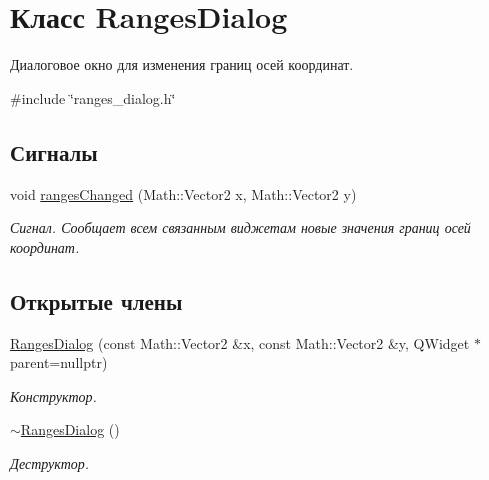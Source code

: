 \hypertarget{class_ranges_dialog}{}\section{Класс Ranges\+Dialog}
\label{class_ranges_dialog}


Диалоговое окно для изменения границ осей координат.  




{\ttfamily \#include \char`\"{}ranges\+\_\+dialog.\+h\char`\"{}}

\subsection*{Сигналы}
\begin{DoxyCompactItemize}
\item 
void \hyperlink{class_ranges_dialog_a8d4fb1f4d8bd2e5e3d0bc36f390e4974}{ranges\+Changed} (Math\+::\+Vector2 x, Math\+::\+Vector2 y)
\begin{DoxyCompactList}\small\item\em Сигнал. Сообщает всем связанным виджетам новые значения границ осей координат. \end{DoxyCompactList}\end{DoxyCompactItemize}
\subsection*{Открытые члены}
\begin{DoxyCompactItemize}
\item 
\hyperlink{class_ranges_dialog_a029bf2335408c07771d67c5875433214}{Ranges\+Dialog} (const Math\+::\+Vector2 \&x, const Math\+::\+Vector2 \&y, Q\+Widget $\ast$parent=nullptr)
\begin{DoxyCompactList}\small\item\em Конструктор. \end{DoxyCompactList}\item 
\hypertarget{class_ranges_dialog_a0852f0249101bfae86f5b7c037b77f97}{}\label{class_ranges_dialog_a0852f0249101bfae86f5b7c037b77f97} 
\hyperlink{class_ranges_dialog_a0852f0249101bfae86f5b7c037b77f97}{$\sim$\+Ranges\+Dialog} ()
\begin{DoxyCompactList}\small\item\em Деструктор. \end{DoxyCompactList}\end{DoxyCompactItemize}
